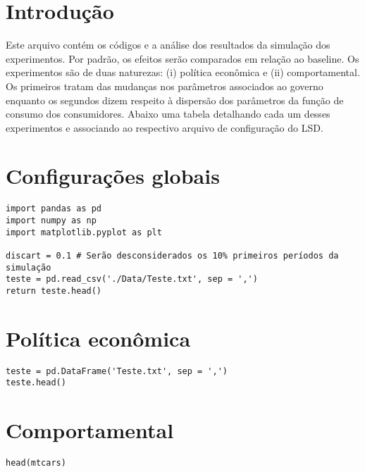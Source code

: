 \documentclass[11pt]{article}
\author{Gabriel Petrini da Silveira}
\date{\today}
\title{}
\begin{document}
\tableofcontents

\section{Introdução}
\label{sec:orge111781}

Este arquivo contém os códigos e a análise dos resultados da simulação dos experimentos. 
Por padrão, os efeitos serão comparados em relação ao baseline.
Os experimentos são de duas naturezas: (i) política econômica e (ii) comportamental.
Os primeiros tratam das mudanças nos parâmetros associados ao governo enquanto os segundos dizem respeito à dispersão dos parâmetros da função de consumo dos consumidores.
Abaixo uma tabela detalhando cada um desses experimentos e associando ao respectivo arquivo de configuração do LSD.

\section{Configurações globais}
\label{sec:orgbd55e52}




\begin{verbatim}
import pandas as pd
import numpy as np
import matplotlib.pyplot as plt

discart = 0.1 # Serão desconsiderados os 10% primeiros períodos da simulação
teste = pd.read_csv('./Data/Teste.txt', sep = ',')
return teste.head()
\end{verbatim}



\section{Política econômica}
\label{sec:org79d8b42}

\begin{verbatim}
teste = pd.DataFrame('Teste.txt', sep = ',')
teste.head()
\end{verbatim}

\section{Comportamental}
\label{sec:org39f9ceb}

\begin{verbatim}
head(mtcars)
\end{verbatim}
\end{document}
